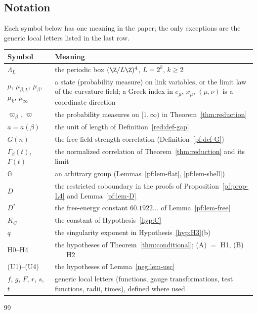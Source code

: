 \subsection*{Notation}
Each symbol below has one meaning in the paper; the only exceptions are the generic local letters listed in the last row.

\begin{center}
\small
\begin{tabular}{@{}p{}p{}@{}}
\toprule
Symbol & Meaning \\
\midrule
$\Lambda_L$ & the periodic box $(\Z/L\Z)^4$, $L=2^k$, $k\ge2$ \\
$\mu$, $\mu_{\beta,L}$, $\mu_\beta$, $\mu_k$, $\mu_\infty$ & a state (probability measure) on link variables, or the limit law of the curvature field; a Greek index in $e_\mu$, $x_\mu$, $(\mu,\nu)$ is a coordinate direction \\
$\varpi_\beta$, $\varpi$ & the probability measures on $[1,\infty)$ in Theorem~\ref{thm:reduction} \\
$a=a(\beta)$ & the unit of length of Definition~\ref{red:def-gap} \\
$G(n)$ & the free field-strength correlation (Definition~\ref{pf:def-G}) \\
$\Gamma_\beta(t)$, $\Gamma(t)$ & the normalized correlation of Theorem~\ref{thm:reduction} and its limit \\
$\mathbb G$ & an arbitrary group (Lemmas~\ref{pf:lem-flat}, \ref{pf:lem-shell}) \\
$D$ & the restricted coboundary in the proofs of Proposition~\ref{pf:prop-L4} and Lemma~\ref{pf:lem-D} \\
$D^*$ & the free-energy constant $60.1922\ldots$ of Lemma~\ref{pf:lem-free} \\
$K_C$ & the constant of Hypothesis~\ref{hyp:C} \\
$q$ & the singularity exponent in Hypothesis~\ref{hyp:H3}(b) \\
H0--H4 & the hypotheses of Theorem~\ref{thm:conditional}; (A) $=$ H1, (B) $=$ H2 \\
(U1)--(U4) & the hypotheses of Lemma~\ref{neg:lem-usc} \\
$f$, $g$, $F$, $r$, $s$, $t$ & generic local letters (functions, gauge transformations, test functions, radii, times), defined where used \\
\bottomrule
\end{tabular}
\end{center}








\begin{thebibliography}{99}


\end{thebibliography}

